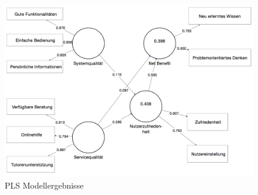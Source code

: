 \begin{figure}[h]
\centering
\includegraphics[width=1\textwidth]{Grafiken/pls_bw_3.png}
\caption{PLS Modellergebnisse}
\label{PLS Modellergebnisse}
\end{figure}